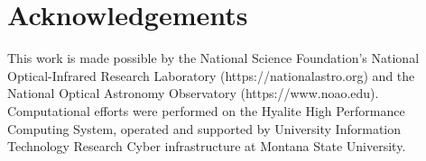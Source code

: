 \documentclass[twocolumn]{aastex62}
\begin{document}
\section{Acknowledgements}
\begin{acknowledgments}
This work is made possible by the National Science Foundation's National Optical-Infrared Research Laboratory (https://nationalastro.org) and the National Optical Astronomy Observatory (https://www.noao.edu).  Computational efforts were performed on the Hyalite High Performance Computing System, operated and supported by University Information Technology Research Cyber infrastructure at Montana State University.




\end{acknowledgments}


%
\end{document}
